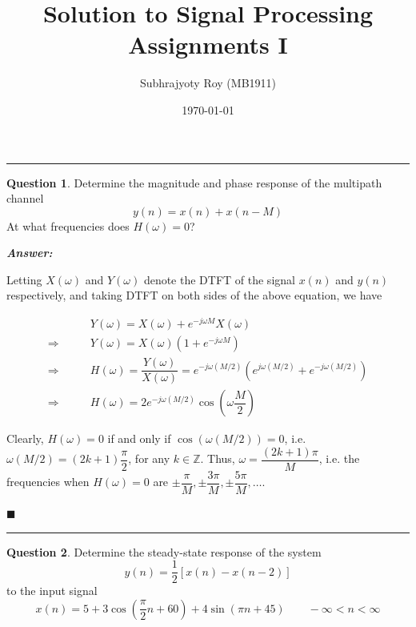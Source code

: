 \documentclass[12pt]{article}
\title{Solution to Signal Processing Assignments I}
\author{Subhrajyoty Roy (MB1911)}
\date{\today}
\theoremstyle{definition}
\newtheorem{question}{Question}
\newenvironment{answer}{
    \textbf{\textit{Answer:}} \qquad
}{\hfill $\blacksquare$ \\ \begin{center}
    \rule{0.6\linewidth}{0.5px}    
\end{center}
}
\newcommand{\Z}{\mathbb{Z}}
\begin{document}
\maketitle

\begin{center}
    \rule{0.8\textwidth}{1px} 
\end{center}
\vspace*{2em}


\begin{question}
    Determine the magnitude and phase response of the multipath channel
    $$
    y(n) = x(n) + x(n - M)
    $$
    At what frequencies does $H(\omega) = 0$?
\end{question}

\begin{answer}
    Letting $X(\omega)$ and $Y(\omega)$ denote the DTFT of the signal $x(n)$ and $y(n)$ respectively, and taking DTFT on both sides of the above equation, we have 

    \begin{align*}
        & Y(\omega) = X(\omega) + e^{-j\omega M} X(\omega)\\
        \Rightarrow \qquad & Y(\omega) = X(\omega) (1 + e^{-j\omega M})\\
        \Rightarrow \qquad & H(\omega) = \dfrac{Y(\omega)}{X(\omega)} = e^{-j\omega (M/2)} (e^{j \omega (M/2)} + e^{-j\omega (M/2)})\\
        \Rightarrow \qquad & H(\omega) = 2e^{-j\omega (M/2)} \cos\left( \omega \dfrac{M}{2} \right)
    \end{align*}

    Clearly, $H(\omega) = 0$ if and only if $\cos(\omega (M/2)) = 0$, i.e. $\omega (M/2) = (2k+1)\dfrac{\pi}{2}$, for any $k \in \Z$. Thus, $\omega = \dfrac{(2k+1)\pi}{M}$, i.e. the frequencies when $H(\omega) = 0$ are $\pm \dfrac{\pi}{M}, \pm \dfrac{3\pi}{M}, \pm \dfrac{5\pi}{M}, \dots$.

\end{answer}


\begin{question}
    Determine the steady-state response of the system 
    $$
    y(n) = \dfrac{1}{2} [x(n) - x(n-2)]
    $$
    to the input signal 
    $$
    x(n) = 5 + 3\cos\left( \dfrac{\pi}{2}n + 60 \right) + 4 \sin(\pi n + 45) \qquad -\infty < n < \infty
    $$
\end{question}
\end{document}
